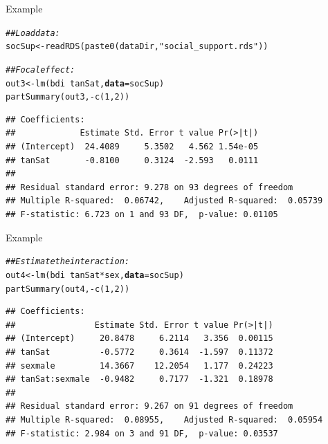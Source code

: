 \documentclass{beamer}\usepackage[]{graphicx}\usepackage[]{color}
\makeatletter
\newcommand{\hlnum}[1]{\textcolor[rgb]{0.69,0.494,0}{#1}}%
\newcommand{\hlstr}[1]{\textcolor[rgb]{0.749,0.012,0.012}{#1}}%
\newcommand{\hlcom}[1]{\textcolor[rgb]{0.514,0.506,0.514}{\textit{#1}}}%
\newcommand{\hlopt}[1]{\textcolor[rgb]{0,0,0}{#1}}%
\newcommand{\hlstd}[1]{\textcolor[rgb]{0,0,0}{#1}}%
\newcommand{\hlkwb}[1]{\textcolor[rgb]{0,0.341,0.682}{#1}}%
\newcommand{\hlkwc}[1]{\textcolor[rgb]{0,0,0}{\textbf{#1}}}%
\newcommand{\hlkwd}[1]{\textcolor[rgb]{0.004,0.004,0.506}{#1}}%
\newenvironment{kframe}{%
 \def\at@end@of@kframe{}%
 \ifinner\ifhmode%
  \def\at@end@of@kframe{\end{minipage}}%
  \begin{minipage}{\columnwidth}%
 \fi\fi%
 \def\FrameCommand##1{\hskip\@totalleftmargin \hskip-\fboxsep
 \colorbox{shadecolor}{##1}\hskip-\fboxsep
     \hskip-\linewidth \hskip-\@totalleftmargin \hskip\columnwidth}%
 \MakeFramed {\advance\hsize-\width
   \@totalleftmargin\z@ \linewidth\hsize
   \@setminipage}}%
 {\par\unskip\endMakeFramed%
 \at@end@of@kframe}
\newenvironment{knitrout}{}{} %
\makeatother
\begin{document}
\begin{frame}[fragile]{Example}
  
\begin{knitrout}\footnotesize
{}\color{fgcolor}\begin{kframe}
\begin{alltt}
\hlcom{## Load data:}
\hlstd{socSup} \hlkwb{<-} \hlkwd{readRDS}\hlstd{(}\hlkwd{paste0}\hlstd{(dataDir,} \hlstr{"social_support.rds"}\hlstd{))}

\hlcom{## Focal effect:}
\hlstd{out3} \hlkwb{<-} \hlkwd{lm}\hlstd{(bdi} \hlopt{~} \hlstd{tanSat,} \hlkwc{data} \hlstd{= socSup)}
\hlkwd{partSummary}\hlstd{(out3,} \hlopt{-}\hlkwd{c}\hlstd{(}\hlnum{1}\hlstd{,} \hlnum{2}\hlstd{))}
\end{alltt}
\begin{verbatim}
## Coefficients:
##             Estimate Std. Error t value Pr(>|t|)
## (Intercept)  24.4089     5.3502   4.562 1.54e-05
## tanSat       -0.8100     0.3124  -2.593   0.0111
## 
## Residual standard error: 9.278 on 93 degrees of freedom
## Multiple R-squared:  0.06742,	Adjusted R-squared:  0.05739 
## F-statistic: 6.723 on 1 and 93 DF,  p-value: 0.01105
\end{verbatim}
\end{kframe}
\end{knitrout}

\end{frame}


\begin{frame}[fragile]{Example}

\begin{knitrout}\footnotesize
{}\color{fgcolor}\begin{kframe}
\begin{alltt}
\hlcom{## Estimate the interaction:}
\hlstd{out4} \hlkwb{<-} \hlkwd{lm}\hlstd{(bdi} \hlopt{~} \hlstd{tanSat} \hlopt{*} \hlstd{sex,} \hlkwc{data} \hlstd{= socSup)}
\hlkwd{partSummary}\hlstd{(out4,} \hlopt{-}\hlkwd{c}\hlstd{(}\hlnum{1}\hlstd{,} \hlnum{2}\hlstd{))}
\end{alltt}
\begin{verbatim}
## Coefficients:
##                Estimate Std. Error t value Pr(>|t|)
## (Intercept)     20.8478     6.2114   3.356  0.00115
## tanSat          -0.5772     0.3614  -1.597  0.11372
## sexmale         14.3667    12.2054   1.177  0.24223
## tanSat:sexmale  -0.9482     0.7177  -1.321  0.18978
## 
## Residual standard error: 9.267 on 91 degrees of freedom
## Multiple R-squared:  0.08955,	Adjusted R-squared:  0.05954 
## F-statistic: 2.984 on 3 and 91 DF,  p-value: 0.03537
\end{verbatim}
\end{kframe}
\end{knitrout}

\end{frame}
\end{document}
